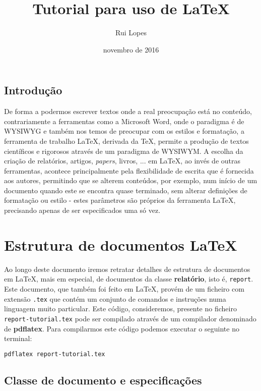 \documentclass[a4paper, onecolumn, 10pt]{report}
\title{Tutorial para uso de \LaTeX}
\author{Rui Lopes}
\date{novembro de 2016}
\begin{document}
\maketitle

\section{Introdução}
De forma a podermos escrever textos onde a real preocupação está no conteúdo,
contrariamente a ferramentas como a Microsoft Word, onde o paradigma é de \ac{WYSIWYG} e também
nos temos de preocupar com os estilos e formatação, a ferramenta de trabalho \LaTeX, derivada
da \TeX, permite a produção de textos científicos e rigorosos através de um paradigma de
\ac{WYSIWYM}. A escolha da criação de relatórios, artigos, \textit{papers}, livros, ... em
\LaTeX, ao invés de outras ferramentas, acontece principalmente pela flexibilidade de escrita que é
fornecida aos autores, permitindo que se alterem conteúdos, por exemplo, num início de um documento
quando este se encontra quase terminado, sem alterar definições de formatação ou estilo - estes
parâmetros são próprios da ferramenta \LaTeX, precisando apenas de ser especificados uma só vez.

\chapter{Estrutura de documentos \LaTeX}
Ao longo deste documento iremos retratar detalhes de estrutura de documentos em \LaTeX, mais em
especial, de documentos da classe \textbf{relatório}, isto é, \texttt{report}.\\
Este documento, que também foi feito em \LaTeX, provém de um ficheiro com extensão \texttt{.tex} que contém
um conjunto de comandos e instruções numa linguagem muito particular. Este código, consideremos, presente
no ficheiro \texttt{report-tutorial.tex} pode ser compilado através de um compilador denominado de
\textbf{pdflatex}. Para compilarmos este código podemos executar o seguinte no terminal:

\begin{lstlisting}[language=sh, style=console]
pdflatex report-tutorial.tex
\end{lstlisting}

\section{Classe de documento e especificações}
\end{document}
